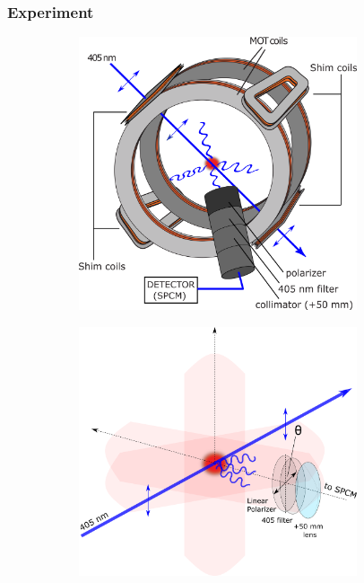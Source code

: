 \documentclass{beamer}
\theoremstyle{definition}
\begin{document}
\begin{frame}
\frametitle{Experiment}




\begin{figure}[!htb]
	\centering
	\hspace{10 pt}
	\begin{subfigure}{0.49\textwidth}
		\includegraphics[width=0.9\textwidth]{MOT.png}
	\end{subfigure}
	\hspace{-20 pt}
	\begin{subfigure}{0.49\textwidth}
		\includegraphics[width=0.9\textwidth]{experimental_geometry}
	\end{subfigure}
\end{figure}


\end{frame}
\end{document}
